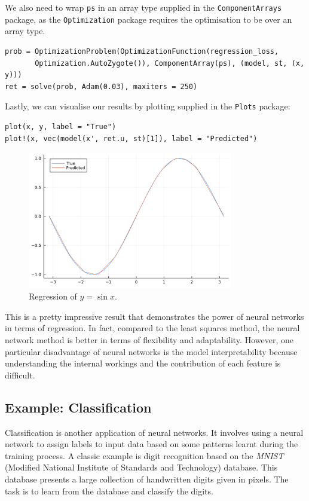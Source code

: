 \documentclass[a4paper,11pt,titlepage]{article}
\theoremstyle{definition}
\theoremstyle{plain}
\theoremstyle{remark}
\begin{document}
We also need to wrap \verb|ps| in an array type supplied in the \verb|ComponentArrays| package, as the \verb|Optimization| package requires the optimisation to be over an array type.

\begin{verbatim}
prob = OptimizationProblem(OptimizationFunction(regression_loss,
       Optimization.AutoZygote()), ComponentArray(ps), (model, st, (x, y)))
ret = solve(prob, Adam(0.03), maxiters = 250)
\end{verbatim}

Lastly, we can visualise our results by plotting supplied in the \verb|Plots| package:

\begin{verbatim}
plot(x, y, label = "True")
plot!(x, vec(model(x', ret.u, st)[1]), label = "Predicted")
\end{verbatim}

\begin{figure}[htbp]
    \centering
    \includegraphics[width=0.8\textwidth]{figures/Regression.png}
    \caption{Regression of $y = \sin x$.}
\end{figure}

This is a pretty impressive result that demonstrates the power of neural networks in terms of regression. In fact, compared to the least squares method, the neural network method is better in terms of flexibility and adaptability. However, one particular disadvantage of neural networks is the model interpretability because understanding the internal workings and the contribution of each feature is difficult.

\subsection{Example: Classification}

Classification is another application of neural networks. It involves using a neural network to assign labels to input data based on some patterns learnt during the training process. A classic example is digit recognition based on the \textit{MNIST} (Modified National Institute of Standards and Technology) database. This database presents a large collection of handwritten digits given in pixels. The task is to learn from the database and classify the digits.
\end{document}
